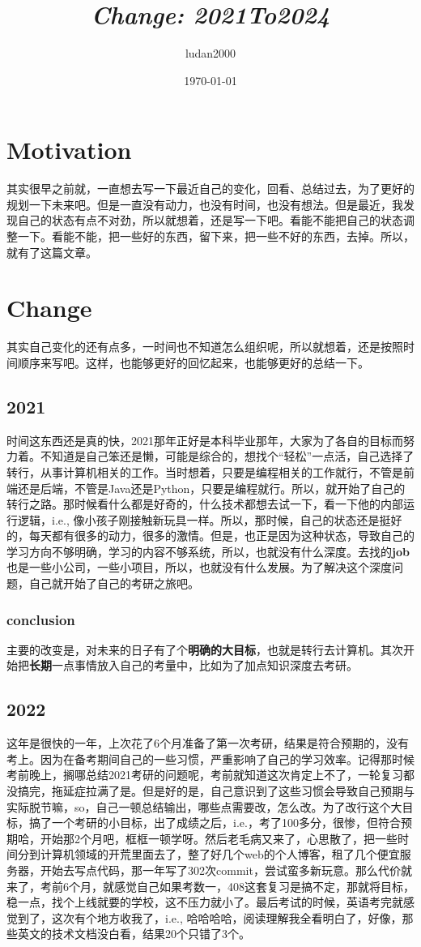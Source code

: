 \documentclass{article}
\title{\textit{Change: 2021To2024}}
\author{ludan2000}
\date{\today}
\begin{document}
\maketitle
\section{Motivation}
其实很早之前就，一直想去写一下最近自己的变化，回看、总结过去，为了更好的规划一下未来吧。但是一直没有动力，也没有时间，也没有想法。但是最近，我发现自己的状态有点不对劲，所以就想着，还是写一下吧。看能不能把自己的状态调整一下。看能不能，把一些好的东西，留下来，把一些不好的东西，去掉。所以，就有了这篇文章。

\section{Change}
其实自己变化的还有点多，一时间也不知道怎么组织呢，所以就想着，还是按照时间顺序来写吧。这样，也能够更好的回忆起来，也能够更好的总结一下。
\subsection{2021}
时间这东西还是真的快，2021那年正好是本科毕业那年，大家为了各自的目标而努力着。不知道是自己笨还是懒，可能是综合的，想找个“轻松”一点活，自己选择了转行，从事计算机相关的工作。当时想着，只要是编程相关的工作就行，不管是前端还是后端，不管是Java还是Python，只要是编程就行。所以，就开始了自己的转行之路。那时候看什么都是好奇的，什么技术都想去试一下，看一下他的内部运行逻辑，i.e., 像小孩子刚接触新玩具一样。所以，那时候，自己的状态还是挺好的，每天都有很多的动力，很多的激情。但是，也正是因为这种状态，导致自己的学习方向不够明确，学习的内容不够系统，所以，也就没有什么深度。去找的\textbf{job}也是一些小公司，一些小项目，所以，也就没有什么发展。为了解决这个深度问题，自己就开始了自己的考研之旅吧。
\subsubsection*{conclusion}
主要的改变是，对未来的日子有了个\textbf{明确的大目标}，也就是转行去计算机。其次开始把\textbf{长期}一点事情放入自己的考量中，比如为了加点知识深度去考研。

\subsection{2022}
这年是很快的一年，上次花了6个月准备了第一次考研，结果是符合预期的，没有考上。因为在备考期间自己的一些习惯，严重影响了自己的学习效率。记得那时候考前晚上，搁哪总结2021考研的问题呢，考前就知道这次肯定上不了，一轮复习都没搞完，拖延症拉满了是。但是好的是，自己意识到了这些习惯会导致自己预期与实际脱节嘛，so，自己一顿总结输出，哪些点需要改，怎么改。为了改行这个大目标，搞了一个考研的小目标，出了成绩之后，i.e.，考了100多分，很惨，但符合预期哈，开始那2个月吧，框框一顿学呀。然后老毛病又来了，心思散了，把一些时间分到计算机领域的开荒里面去了，整了好几个web的个人博客，租了几个便宜服务器，开始去写点代码，那一年写了302次commit，尝试蛮多新玩意。那么代价就来了，考前6个月，就感觉自己如果考数一，408这套复习是搞不定，那就将目标，稳一点，找个上线就要的学校，这不压力就小了。最后考试的时候，英语考完就感觉到了，这次有个地方收我了，i.e., 哈哈哈哈，阅读理解我全看明白了，好像，那些英文的技术文档没白看，结果20个只错了3个。
\end{document}
